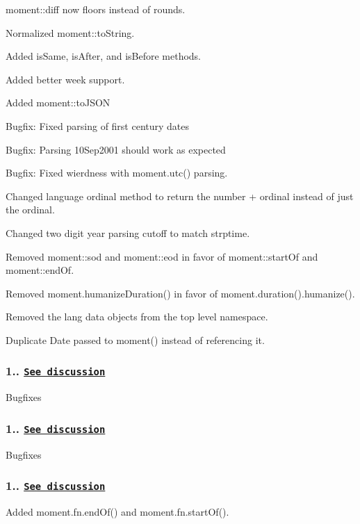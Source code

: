{\ttfamily moment\+::diff} now floors instead of rounds.

Normalized {\ttfamily moment\+::to\+String}.

Added {\ttfamily is\+Same}, {\ttfamily is\+After}, and {\ttfamily is\+Before} methods.

Added better week support.

Added {\ttfamily moment\+::to\+J\+S\+ON}

Bugfix\+: Fixed parsing of first century dates

Bugfix\+: Parsing 10\+Sep2001 should work as expected

Bugfix\+: Fixed wierdness with {\ttfamily moment.\+utc()} parsing.

Changed language ordinal method to return the number + ordinal instead of just the ordinal.

Changed two digit year parsing cutoff to match strptime.

Removed {\ttfamily moment\+::sod} and {\ttfamily moment\+::eod} in favor of {\ttfamily moment\+::start\+Of} and {\ttfamily moment\+::end\+Of}.

Removed {\ttfamily moment.\+humanize\+Duration()} in favor of {\ttfamily moment.\+duration().humanize()}.

Removed the lang data objects from the top level namespace.

Duplicate {\ttfamily Date} passed to {\ttfamily moment()} instead of referencing it.

\subsubsection*{1.. \href{https://github.com/timrwood/moment/issues/456}{\tt See discussion}}

Bugfixes

\subsubsection*{1.. \href{https://github.com/timrwood/moment/issues/384}{\tt See discussion}}

Bugfixes

\subsubsection*{1.. \href{https://github.com/timrwood/moment/issues/288}{\tt See discussion}}

Added {\ttfamily moment.\+fn.\+end\+Of()} and {\ttfamily moment.\+fn.\+start\+Of()}.

